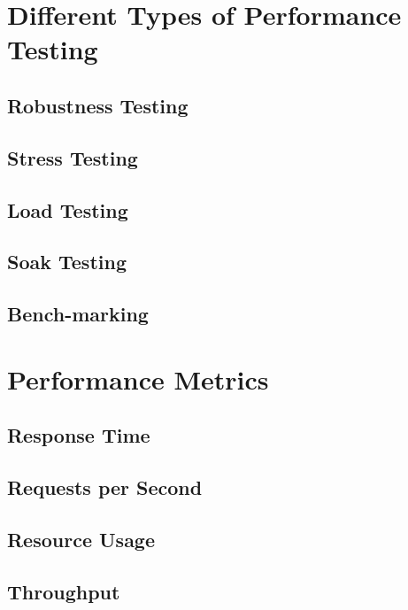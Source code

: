 \section{Different Types of Performance Testing}
\label{Different Types of Performance Testing}

\subsection*{Robustness Testing}

\subsection*{Stress Testing}

\subsection*{Load Testing}

\subsection*{Soak Testing}
\label{Soak Testing}

\subsection*{Bench-marking}

\section{Performance Metrics}
\label{Performance Metrics}

\subsection{Response Time}

\subsection{Requests per Second}

\subsection{Resource Usage}

\subsection{Throughput}

